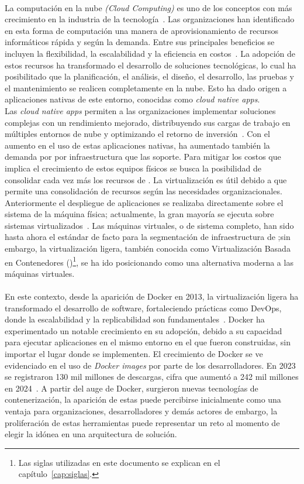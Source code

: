 \label{cap:introduccion}
\mbox{}\\
La computación en la nube \textit{(Cloud Computing)} es uno de los conceptos con más crecimiento en la industria de la tecnología~\citep{Jayaweera2024}. Las organizaciones han identificado en esta forma de computación una manera de aprovisionamiento de recursos informáticos rápida y según la demanda. Entre sus principales beneficios se incluyen la flexibilidad, la escalabilidad y la eficiencia en costos~\citep{Ahmadi2024}. La adopción de estos recursos ha transformado el desarrollo de soluciones tecnológicas, lo cual ha posibilitado que la planificación, el análisis, el diseño, el desarrollo, las pruebas y el mantenimiento se realicen completamente en la nube. Esto ha dado origen a aplicaciones nativas de este entorno, conocidas como \textit{cloud native apps}.\\
Las \textit{cloud native apps} permiten a las organizaciones implementar soluciones complejas con un rendimiento mejorado, distribuyendo sus cargas de trabajo en múltiples entornos de nube y optimizando el retorno de inversión~\citep{Alonso2023}. Con el aumento en el uso de estas aplicaciones nativas, ha aumentado también la demanda por por infraestructura que las soporte. Para mitigar los costos que implica el crecimiento de estos equipos físicos se busca la posibilidad de consolidar cada vez más los recursos de \TI. La virtualización es útil debido a que permite una consolidación de recursos según las necesidades organizacionales. Anteriormente el despliegue de aplicaciones se realizaba directamente sobre el sistema de la máquina física; actualmente, la gran mayoría se ejecuta sobre sistemas virtualizados~\citep{Jain2016}. Las máquinas virtuales, o de sistema completo, han sido hasta ahora el estándar de facto para la segmentación de infraestructura de \TI;\@ sin embargo, la virtualización ligera, también conocida como Virtualización Basada en Contenedores (\textbf{\VBC})\footnote{Las siglas utilizadas en este documento se explican en el capítulo~\ref{cap:siglas}.}, se ha ido posicionando como una alternativa moderna a las máquinas virtuales.\\ \\
En este contexto, desde la aparición de Docker en 2013, la virtualización ligera ha transformado el desarrollo de software, fortaleciendo prácticas como DevOps, donde la escalabilidad y la replicabilidad son fundamentales~\citep{Docker2021}. Docker ha experimentado un notable crecimiento en su adopción, debido a su capacidad para ejecutar aplicaciones en el mismo entorno en el que fueron construidas, sin importar el lugar donde se implementen. El crecimiento de Docker se ve evidenciado en el uso de \textit{Docker images} por parte de los desarrolladores. En 2023 se registraron 130 mil millones de descargas, cifra que aumentó a 242 mil millones en 2024~\citep{Docker2024}. A partir del auge de Docker, surgieron nuevas tecnologías de contenerización, la aparición de estas puede percibirse inicialmente como una ventaja para organizaciones, desarrolladores y demás actores de \TI\;\@sin embargo, la proliferación de estas herramientas puede representar un reto al momento de elegir la idónea en una arquitectura de solución.\\
